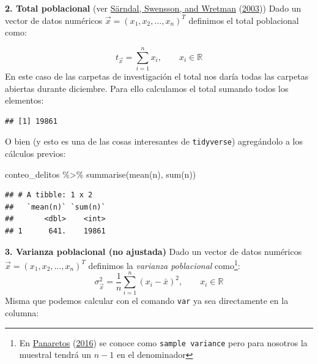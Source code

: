 \documentclass[
]{book}
\newenvironment{Shaded}{\begin{snugshade}}{\end{snugshade}}
\newcommand{\FunctionTok}[1]{\textcolor[rgb]{0.00,0.00,0.00}{#1}}
\newcommand{\NormalTok}[1]{#1}
\newcommand{\SpecialCharTok}[1]{\textcolor[rgb]{0.00,0.00,0.00}{#1}}
\begin{document}
\textbf{2. Total poblacional} (ver \protect\hyperlink{ref-sarndal2003model}{Särndal, Swensson, and Wretman} (\protect\hyperlink{ref-sarndal2003model}{2003})) Dado un vector de datos numéricos \(\vec{x} = (x_1, x_2, \dots, x_n)^T\) definimos el total poblacional como:

\[
t_{\vec{x}} = \sum\limits_{i=1}^{n} x_i, \qquad x_i \in \mathbb{R}
\]
En este caso de las carpetas de investigación el total nos daría todas las carpetas abiertas durante diciembre. Para ello calculamos el total sumando todos los elementos:

\begin{Shaded}
\end{Shaded}

\begin{verbatim}
## [1] 19861
\end{verbatim}

O bien (y esto es una de las cosas interesantes de \texttt{tidyverse}) agregándolo a los cálculos previos:

\begin{Shaded}
\begin{Highlighting}[]
\NormalTok{conteo\_delitos }\SpecialCharTok{\%\textgreater{}\%} \FunctionTok{summarise}\NormalTok{(}\FunctionTok{mean}\NormalTok{(n), }\FunctionTok{sum}\NormalTok{(n))}
\end{Highlighting}
\end{Shaded}

\begin{verbatim}
## # A tibble: 1 x 2
##   `mean(n)` `sum(n)`
##       <dbl>    <int>
## 1      641.    19861
\end{verbatim}

\textbf{3. Varianza poblacional (no ajustada)} Dado un vector de datos numéricos \(\vec{x} = (x_1, x_2, \dots, x_n)^T\) definimos la \emph{varianza poblacional} como\footnote{En \protect\hyperlink{ref-panaretos2016statistics}{Panaretos} (\protect\hyperlink{ref-panaretos2016statistics}{2016}) se conoce como \texttt{sample\ variance} pero para nosotros la muestral tendrá un \(n-1\) en el denominador}:
\[
\sigma^2_{\vec{x}} = \dfrac{1}{n} \sum\limits_{i=1}^{n} (x_i - \bar{x})^2, \qquad x_i \in \mathbb{R}
\]
Misma que podemos calcular con el comando \texttt{var} ya sea directamente en la columna:

\begin{Shaded}
\end{Shaded}
\end{document}
